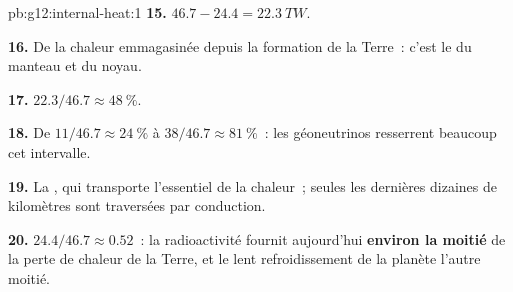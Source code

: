 \begin{solution}{pb:g12:internal-heat:1}
\textbf{15.} $46.7 - 24.4 = \qty{22.3}{TW}$.

\textbf{16.} De la chaleur emmagasinée depuis la formation de la Terre~:
c'est le  du manteau et du noyau.

\textbf{17.} $22.3/46.7 \approx \qty{48}{\percent}$.

\textbf{18.} De $11/46.7 \approx \qty{24}{\percent}$ à $38/46.7 \approx
\qty{81}{\percent}$~: les géoneutrinos resserrent beaucoup cet intervalle.

\textbf{19.} La , qui transporte l'essentiel de la
chaleur~; seules les dernières dizaines de kilomètres sont traversées par
conduction.

\textbf{20.} $24.4/46.7 \approx 0.52$~: la radioactivité fournit
aujourd'hui \textbf{environ la moitié} de la perte de chaleur de la Terre,
et le lent refroidissement de la planète l'autre moitié.
\end{solution}
